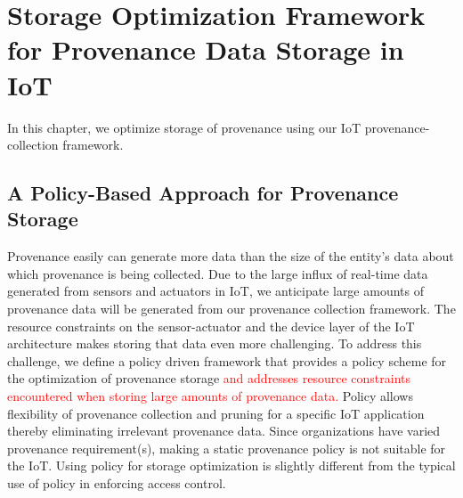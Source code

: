
\chapter{Storage Optimization Framework for Provenance Data Storage in IoT} \label{MostNarrowEasy}

In this chapter, we optimize storage of provenance using our IoT provenance-collection framework.

%
%


\section{A Policy-Based Approach for Provenance Storage}
\par Provenance easily can generate more data than the size of the entity's data about  which provenance is being collected. Due to the large influx of real-time data generated from sensors and actuators in IoT, we anticipate large amounts of provenance data will be generated from our provenance collection framework. The resource constraints on the sensor-actuator and the device layer of the IoT architecture makes storing that data even more challenging. To address this challenge, we define a policy driven framework that provides a policy scheme for the optimization of provenance storage \textcolor{red}{and addresses resource constraints encountered when storing large amounts of provenance data.} Policy allows flexibility of provenance collection and pruning for a specific IoT application thereby eliminating irrelevant provenance data. Since organizations have varied provenance requirement(s), making a static provenance policy is not suitable for the IoT. Using policy for storage optimization is slightly different from the typical use of policy in enforcing access control. 




